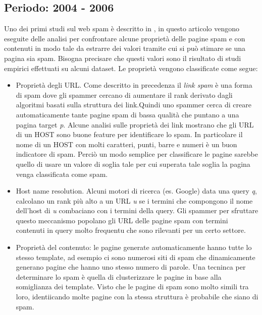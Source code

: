 \subsection{Periodo: 2004 - 2006}
Uno dei primi studi sul web spam è descritto in \cite{Fetterly:2004:SDS:1017074.1017077}, in questo articolo vengono eseguite delle analisi per confrontare alcune proprietà delle pagine spam e con contenuti in modo tale da estrarre dei valori tramite cui si può stimare se una pagina sia spam. Bisogna precisare che questi valori sono il risultato di studi empirici effettuati su alcuni dataset. Le proprietà vengono classificate come segue:
\begin{itemize}
 \item 	Proprietà degli URL. Come descritto in precedenza il \textit{link spam} è una forma di spam dove gli spammer cercano di aumentare il rank derivato dagli algoritmi basati sulla struttura dei link.Quindi uno spammer cerca di creare automaticamente tante pagine spam di bassa qualità che puntano a una pagina target \textit{p}. Alcune analisi sulle proprietà dei link mostrano che gli URL di un HOST sono buone feature per identificare lo spam. In particolare il nome di un HOST con molti caratteri, punti, barre e numeri è un buon indicatore di spam. Perciò un modo semplice per classificare le pagine sarebbe quello di usare un valore di soglia tale per cui superata tale soglia la pagina venga classificata come spam. 
 
 \item Host name resolution. Alcuni motori di ricerca (es. Google) data una query \textit{q}, calcolano un rank più alto a un URL \textit{u} se i termini che compongono  il nome dell'host di \textit{u} combaciano con i termini della query. Gli spammer per sfruttare questo meccanismo popolano gli URL delle pagine spam con termini contenuti in query molto frequentu che sono rilevanti per un certo settore.
 
 \item Proprietà del contenuto: le pagine generate automaticamente hanno tutte lo stesso template, ad esempio ci sono numerosi siti di spam che dinamicamente generano pagine che hanno uno stesso numero di parole. Una tecninca per determinare lo spam è quella di clusterizzare le pagine in base alla somiglianza dei template. Visto che le pagine di spam sono molto simili tra loro, identiicando molte pagine con la stessa struttura è probabile che siano di spam.
\end{itemize}

